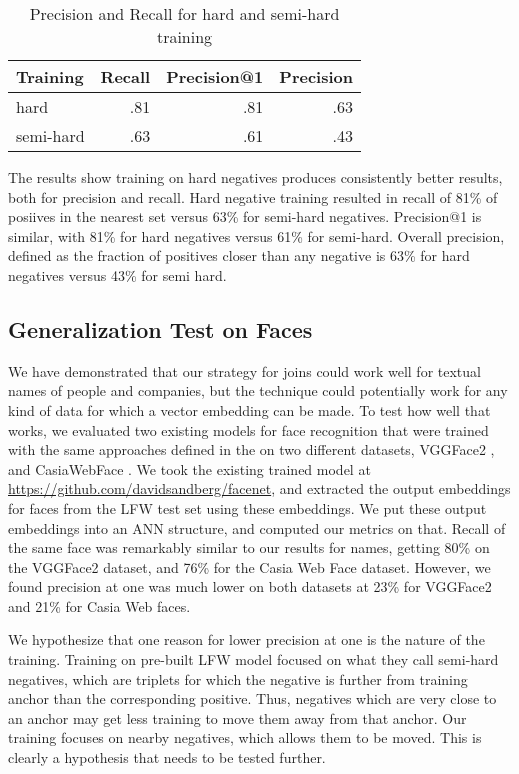 \begin{table}[ht]
\caption{Precision and Recall for hard and semi-hard training}
\label{hard-semi-hard}
\begin{center}
\begin{tabular}{|l|r|r|r|}
\hline
Training & Recall & Precision@1 & Precision \\
\hline
hard & .81 & .81 & .63 \\
\hline
semi-hard & .63 & .61 & .43 \\
\hline
\end{tabular}%
\end{center}
\end{table}

 The results show training on hard negatives produces consistently better results, both for precision and recall.  Hard negative training resulted in recall of 81\% of posiives in the nearest set versus 63\% for semi-hard negatives.  Precision@1 is similar, with 81\% for hard negatives versus 61\% for semi-hard.  Overall precision, defined as the fraction of positives closer than any negative is 63\% for hard negatives versus 43\% for semi hard.

\subsection{Generalization Test on Faces}

 We have demonstrated that our strategy for joins could work well for textual names of people and companies, but the technique could potentially work for any kind of data for which a vector embedding can be made.  To test how well that works, we evaluated two existing models for face recognition that were trained with the same approaches defined in the \cite{DBLP:conf/cvpr/SchroffKP15} on two different datasets, VGGFace2 \cite{DBLP:conf/fgr/CaoSXPZ18}, and CasiaWebFace \cite{DBLP:conf/cvpr/SchroffKP15}.  We took the existing trained model at \url{https://github.com/davidsandberg/facenet}, and extracted the output embeddings for faces from the LFW test set \cite{Huang2012a} using these embeddings.  We put these output embeddings into an ANN structure, and computed our metrics on that.  Recall of the same face was remarkably similar to our results for names, getting 80\% on the VGGFace2 dataset, and 76\% for the Casia Web Face dataset.  However, we found precision at one was much lower on both datasets at 23\% for VGGFace2 and 21\% for Casia Web faces.

We hypothesize that one reason for lower precision at one is the nature of the training.  Training on pre-built LFW model focused on what they call semi-hard negatives, which are triplets for which the negative is further from training anchor than the corresponding positive.  Thus, negatives which are very close to an anchor may get less training to move them away from that anchor.  Our training focuses on nearby negatives, which allows them to be moved.  This is clearly a hypothesis that needs to be tested further.

